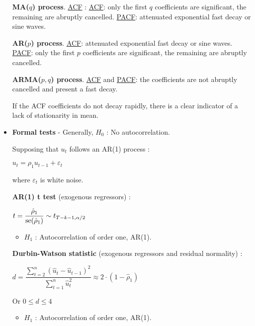 \begin{f}[Detection]
\begin{itemize}[leftmargin=*]
	
	\textbf{MA(\(q\)) process}. \underline{ACF} : \underline{ACF}: only the first \(q\) coefficients are significant, the remaining are abruptly cancelled. \underline{PACF}: attenuated exponential fast decay or sine waves.
	
	\textbf{AR(\(p\)) process}. \underline{ACF}: attenuated exponential fast decay or sine waves. \underline{PACF}: only the first \(p\) coefficients are significant, the remaining are abruptly cancelled.

	
	\textbf{ARMA(\(p, q\)) process}. \underline{ACF} and \underline{PACF}: the coefficients are not abruptly cancelled and present a fast decay.
	
	If the ACF coefficients do not decay rapidly, there is a clear indicator of a lack of stationarity in mean.
	
	\item \textbf{Formal tests} - Generally, \(H_{0}\) : No autocorrelation.
	
	Supposing that \(u_{t}\) follows an AR(1) process :
	
	\begin{center}
		\(u_{t} = \rho_{1} u_{t - 1} + \varepsilon_{t}\)
	\end{center}
	
	where \(\varepsilon_{t}\) is white noise.
	
	\textbf{AR(1) t test} (exogenous regressors) :
	
	\begin{center}
		\(t = \dfrac{\hat{\rho}_{1}}{\mathrm{se}(\hat{\rho}_{1})} \sim t_{T - k - 1, \alpha/2}\)
	\end{center}
	
	\begin{itemize}[leftmargin=*]
		\item \(H_{1}\) : Autocorrelation of order one, AR(1).
	\end{itemize}
	
	\textbf{Durbin-Watson statistic} (exogenous regressors and residual normality) :
	
	\begin{center}
		\(d = \dfrac{\sum_{t=2}^{n} (\hat{u}_{t} - \hat{u}_{t - 1})^{2}}{\sum_{t=1}^{n} \hat{u}_{t}^{2}} \approx 2 \cdot (1 - \hat{\rho}_{1})\)
	\end{center}
	
	Or \(0 \leq d \leq 4\)
	
	\begin{itemize}[leftmargin=*]
		\item \(H_{1}\) : Autocorrelation of order one, AR(1).
	\end{itemize}
	

\end{itemize}
\end{f}
